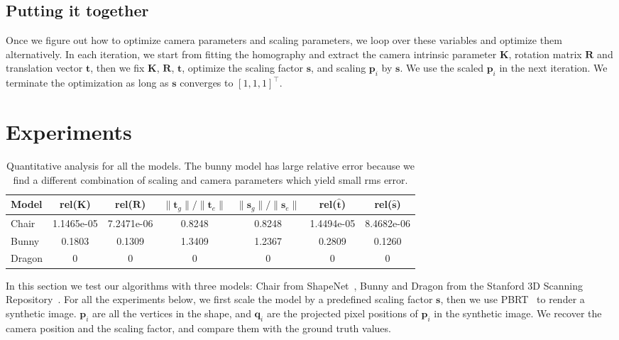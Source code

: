 \documentclass[10pt,twocolumn,letterpaper]{article}
\begin{document}
\subsection{Putting it together}

\noindent
Once we figure out how to optimize camera parameters and scaling parameters, we loop over these variables and optimize them alternatively. In each iteration, we start from fitting the homography and extract the camera intrinsic parameter $\mathbf{K}$, rotation matrix $\mathbf{R}$ and translation vector $\mathbf{t}$, then we fix $\mathbf{K}$, $\mathbf{R}$, $\mathbf{t}$, optimize the scaling factor $\mathbf{s}$, and scaling $\mathbf{p}_i$ by $\mathbf{s}$. We use the scaled $\mathbf{p}_i$ in the next iteration. We terminate the optimization as long as $\mathbf{s}$ converges to $[1,1,1]^\top$.

\section{Experiments}

\begin{table}[t]
\begin{center}
\begin{tabular}{|l|c|c|c|c|c|c|}
\hline
Model & rel($\mathbf{K}$) & rel($\mathbf{R}$) & $\|\mathbf{t}_g\|/\|\mathbf{t}_e\|$ & $\|\mathbf{s}_g\|/\|\mathbf{s}_e\|$ & rel($\hat{\mathbf{t}}$) & rel($\hat{\mathbf{s}}$) \\
\hline\hline
Chair & 1.1465e-05 & 7.2471e-06 & 0.8248 & 0.8248 & 1.4494e-05 & 8.4682e-06 \\
Bunny & 0.1803 & 0.1309 & 1.3409 & 1.2367 & 0.2809 & 0.1260 \\
Dragon & 0 & 0 & 0 & 0 & 0 & 0 \\
\hline
\end{tabular}
\end{center}
\caption{Quantitative analysis for all the models. The bunny model has large relative error because we find a different combination of scaling and camera parameters which yield small rms error.}
\label{tb:err}
\end{table}

\noindent
In this section we test our algorithms with three models: Chair from ShapeNet~\cite{shapenet2015}, Bunny and Dragon from the Stanford 3D Scanning Repository~\cite{stanford3d2014}. For all the experiments below, we first scale the model by a predefined scaling factor $\mathbf{s}$, then we use PBRT~\cite{pharr2010pbrt} to render a synthetic image. $\mathbf{p}_i$ are all the vertices in the shape, and $\mathbf{q}_i$ are the projected pixel positions of $\mathbf{p}_i$ in the synthetic image. We recover the camera position and the scaling factor, and compare them with the ground truth values.\\
\end{document}
